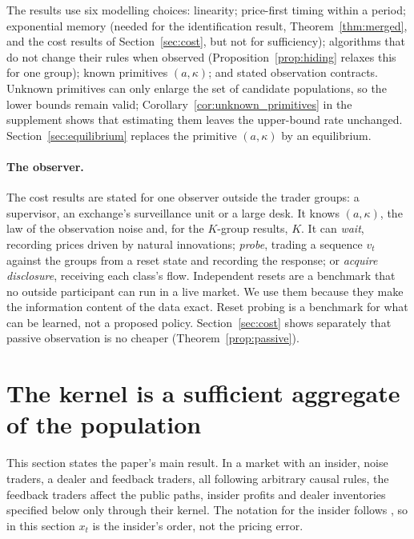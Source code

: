 \documentclass[12pt]{article}
\theoremstyle{definition}
\theoremstyle{remark}
\begin{document}
The results use six modelling choices: linearity; price-first timing within a period; exponential memory (needed for the identification result, Theorem~\ref{thm:merged}, and the cost results of Section~\ref{sec:cost}, but not for sufficiency); algorithms that do not change their rules when observed (Proposition~\ref{prop:hiding} relaxes this for one group); known primitives $(a,\kappa)$; and stated observation contracts. Unknown primitives can only enlarge the set of candidate populations, so the lower bounds remain valid; Corollary~\ref{cor:unknown_primitives} in the supplement shows that estimating them leaves the upper-bound rate unchanged. Section~\ref{sec:equilibrium} replaces the primitive $(a,\kappa)$ by an equilibrium.

\paragraph{The observer.} The cost results are stated for one observer outside the trader groups: a supervisor, an exchange's surveillance unit or a large desk. It knows $(a,\kappa)$, the law of the observation noise and, for the $K$-group results, $K$. It can \emph{wait}, recording prices driven by natural innovations; \emph{probe}, trading a sequence $v_t$ against the groups from a reset state and recording the response; or \emph{acquire disclosure}, receiving each class's flow. Independent resets are a benchmark that no outside participant can run in a live market. We use them because they make the information content of the data exact. Reset probing is a benchmark for what can be learned, not a proposed policy. Section~\ref{sec:cost} shows separately that passive observation is no cheaper (Theorem~\ref{prop:passive}).

\section{The kernel is a sufficient aggregate of the population}\label{sec:suff}

This section states the paper's main result. In a market with an insider, noise traders, a dealer and feedback traders, all following arbitrary causal rules, the feedback traders affect the public paths, insider profits and dealer inventories specified below only through their kernel. The notation for the insider follows \citet{kyle1985}, so in this section $x_t$ is the insider's order, not the pricing error.
\end{document}
